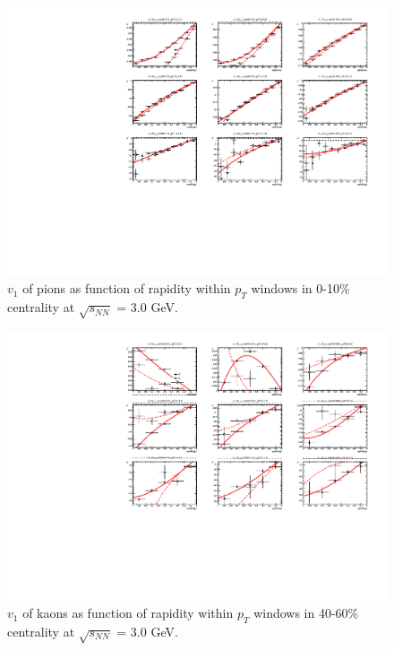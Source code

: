 \begin{figure}[hbt!]
\centering
\includegraphics[width=0.85\linewidth]{figures/chapter03/3gev_pionp_v1VSy_9pT_cent2.pdf}
\caption{$v_1$ of pions as function of rapidity within $p_T$ windows in 0-10\% centrality at $\sqrt{s_{NN}}$ = 3.0 GeV.}
\label{fig:3gev_pion_v1y_pt_cent2}
\end{figure}


\begin{figure}[hbt!]
\centering
\includegraphics[width=0.85\linewidth]{figures/chapter03/3gev_kaonp_v1VSy_9pT_cent0.pdf}
\caption{$v_1$ of kaons as function of rapidity within $p_T$ windows in 40-60\% centrality at $\sqrt{s_{NN}}$ = 3.0 GeV.}
\label{fig:3gev_kaon_v1y_pt_cent0}
\end{figure}
        

